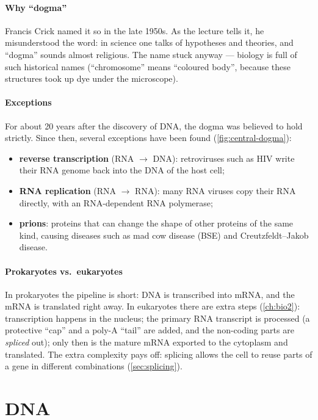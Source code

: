 \documentclass[11pt, oneside]{book}
\let\originalsection\section
\renewcommand{\section}{\Needspace{7\baselineskip}\originalsection}
\begin{document}
\paragraph{Why ``dogma''}
Francis Crick named it so in the late 1950s. As the lecture tells it, he
misunderstood the word: in science one talks of hypotheses and theories, and
``dogma'' sounds almost religious. The name stuck anyway --- biology is full
of such historical names (``chromosome'' means ``coloured body'', because
these structures took up dye under the microscope).

\paragraph{Exceptions}
For about 20 years after the discovery of DNA, the dogma was believed to hold
strictly. Since then, several exceptions have been found
(\cref{fig:central-dogma}):
\begin{itemize}
  \item \textbf{reverse transcription} (RNA $\to$ DNA): retroviruses such as
    HIV write their RNA genome back into the DNA of the host cell;
  \item \textbf{RNA replication} (RNA $\to$ RNA): many RNA viruses copy their
    RNA directly, with an RNA-dependent RNA polymerase;
  \item \textbf{prions}: proteins that can change the shape of other
    proteins of the same kind, causing diseases such as mad cow disease (BSE)
    and Creutzfeldt--Jakob disease.
\end{itemize}

\paragraph{Prokaryotes vs.\ eukaryotes}
In prokaryotes the pipeline is short: DNA is transcribed into mRNA, and the
mRNA is translated right away. In eukaryotes there are extra steps
(\cref{ch:bio2}): transcription happens in the nucleus; the primary RNA
transcript is processed (a protective ``cap'' and a poly-A ``tail'' are
added, and the non-coding parts are \emph{spliced} out); only then is the
mature mRNA exported to the cytoplasm and translated. The extra complexity
pays off: splicing allows the cell to reuse parts of a gene in different
combinations (\cref{sec:splicing}).

\section{DNA}
\end{document}
